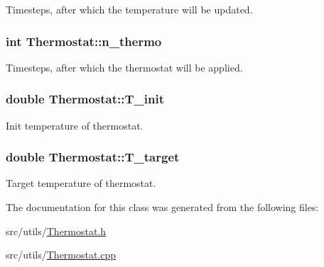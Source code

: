 Timesteps, after which the temperature will be updated. \hypertarget{classThermostat_a25a5e29fbae46ffb4152655b3ba062cf}{
\subsubsection[{n\-\_\-thermo}]{\setlength{\rightskip}{0pt plus 5cm}int Thermostat\-::n\-\_\-thermo\hspace{0.3cm}{\ttfamily [private]}}}\label{classThermostat_a25a5e29fbae46ffb4152655b3ba062cf}
Timesteps, after which the thermostat will be applied. \hypertarget{classThermostat_a663a14e3a4b7bf439c92fbcd0ebac7a3}{
\subsubsection[{T\-\_\-init}]{\setlength{\rightskip}{0pt plus 5cm}double Thermostat\-::\-T\-\_\-init\hspace{0.3cm}{\ttfamily [private]}}}\label{classThermostat_a663a14e3a4b7bf439c92fbcd0ebac7a3}
Init temperature of thermostat. \hypertarget{classThermostat_a63c42ca7dee6ed5237d8be9e9c3f1228}{
\subsubsection[{T\-\_\-target}]{\setlength{\rightskip}{0pt plus 5cm}double Thermostat\-::\-T\-\_\-target\hspace{0.3cm}{\ttfamily [private]}}}\label{classThermostat_a63c42ca7dee6ed5237d8be9e9c3f1228}
Target temperature of thermostat. 

The documentation for this class was generated from the following files\-:\begin{DoxyCompactItemize}
\item 
src/utils/\hyperlink{Thermostat_8h}{Thermostat.\-h}\item 
src/utils/\hyperlink{Thermostat_8cpp}{Thermostat.\-cpp}\end{DoxyCompactItemize}
